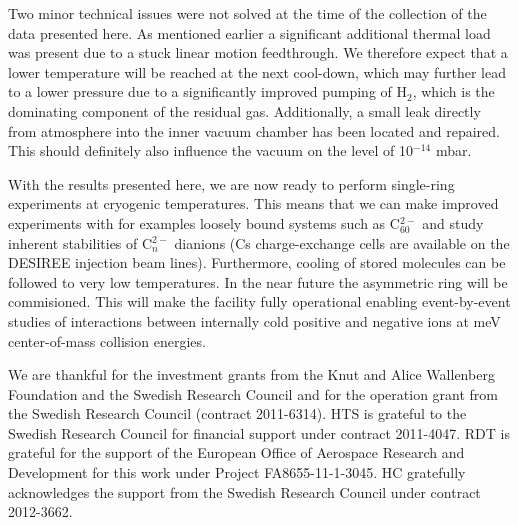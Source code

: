 \documentclass[aps,pra,preprint,superscriptaddress]{revtex4}
\begin{document}
Two minor technical issues were not solved at the time of the collection of the data presented here. As mentioned earlier a significant additional thermal load was present due to a stuck linear motion feedthrough. We therefore expect that a lower temperature will be reached at the next cool-down, which may further lead to a lower pressure due to a significantly improved pumping of H$_2$, which is the dominating component of the residual gas. Additionally, a small leak directly from atmosphere into the inner vacuum chamber has been located and repaired. This should definitely also influence the vacuum on the level of 10$^{-14}$ mbar.

With the results presented here, we are now ready to perform single-ring experiments at cryogenic temperatures. This means that we can make improved experiments with for examples loosely bound systems such as C$_{60}^{2-}$ \cite{Tom06} 
and study inherent stabilities of C$_n^{2-}$ dianions (Cs charge-exchange cells are available on the DESIREE injection beam lines).
Furthermore, cooling of stored molecules \cite{Mar13,Got13} can be followed to very low temperatures. In the near future the asymmetric ring will be
commisioned. This will make the facility fully operational 
enabling event-by-event studies of interactions between internally cold positive and negative ions at meV center-of-mass collision energies.
\begin{acknowledgments}
We are thankful for the investment grants from the Knut and Alice Wallenberg Foundation and the Swedish Research Council and for the operation grant from the Swedish Research Council (contract 2011-6314). HTS is grateful to the Swedish Research Council for financial support under contract 2011-4047. RDT is grateful for the support of the European Office of Aerospace Research and Development for this work under Project FA8655-11-1-3045. HC gratefully acknowledges the support from the Swedish Research Council under contract 2012-3662.
\end{acknowledgments}


%
\end{document}
